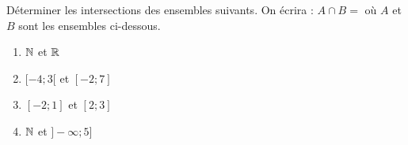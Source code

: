 
Déterminer les intersections des ensembles suivants. On écrira : $A \cap B = $ où $A$ et $B$ sont les ensembles ci-dessous.
\begin{enumerate}
\item $\mathbb N$ et $\mathbb R$
\item $[-4;3[$ et $[-2;7]$
\item $[-2;1]$ et $[2;3]$
\item $\mathbb N$ et $]-\infty;5]$
\end{enumerate}